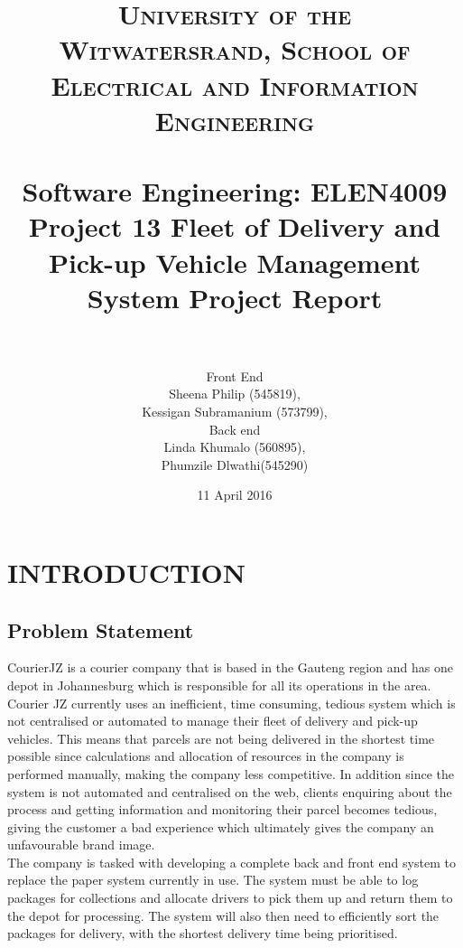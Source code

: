 \documentclass[paper=a4, fontsize=11pt]{scrartcl} %
\title{	
\normalfont \normalsize 
\textsc{University of the Witwatersrand, School of Electrical and Information Engineering} \\ [25pt] %
\horrule{0.5pt} \\[0.4cm] %
\huge Software Engineering: ELEN4009 \\ Project 13  Fleet of Delivery and Pick-up Vehicle Management System Project Report \\ %
\horrule{2pt} \\[0.5cm] %
}
\author{Front End \\ Sheena Philip (545819),\\ Kessigan Subramanium (573799),\\  Back end \\ Linda Khumalo (560895), \\  Phumzile Dlwathi(545290)}
\date{11 April 2016} %
\numberwithin{equation}{section} %
\numberwithin{figure}{section} %
\numberwithin{table}{section} %
\begin{document}
\newpage

\maketitle %
\newpage

\tableofcontents


\newpage
\section{INTRODUCTION}



\subsection{Problem Statement}

CourierJZ is a courier company that is based in the Gauteng region and has one depot in Johannesburg which is responsible for all its operations in the area. Courier JZ currently uses an inefficient, time consuming, tedious system which is not centralised or automated to manage their fleet of delivery and pick-up vehicles.  This means that parcels are not being delivered in the shortest time possible since calculations and allocation of resources in the company is performed manually, making the company less competitive. In addition since the system is not automated and centralised on the web, clients enquiring about the process and getting information and monitoring their parcel becomes tedious, giving the customer a bad experience which ultimately gives the company an unfavourable brand image. \\

The company is tasked with developing a complete back and front end system to replace the paper system currently in use. The system must be able to log packages for collections and allocate drivers to pick them up and return them to the depot for processing. The system will also then need to efficiently sort the packages for delivery, with the shortest delivery time being prioritised. \\
\end{document}
